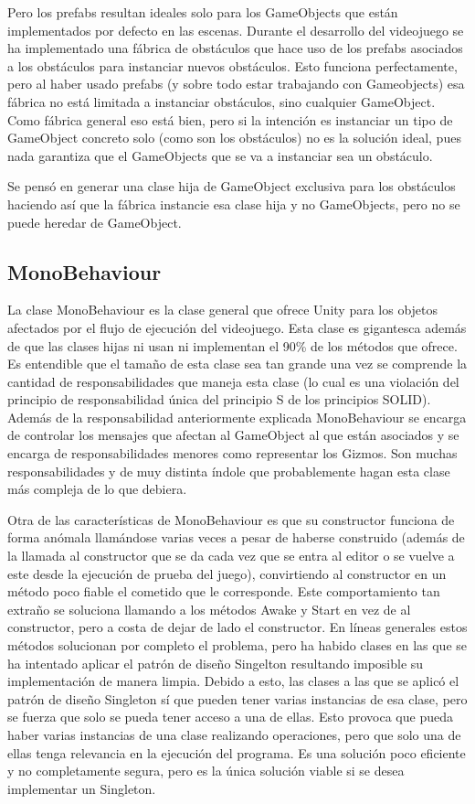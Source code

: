 Pero los prefabs resultan ideales solo para los GameObjects que están implementados por defecto en las escenas. Durante el desarrollo del videojuego se ha implementado una fábrica de obstáculos que hace uso de los prefabs asociados a los obstáculos para instanciar nuevos obstáculos. Esto funciona perfectamente, pero al haber usado prefabs (y sobre todo estar trabajando con Gameobjects) esa fábrica no está limitada a instanciar obstáculos, sino cualquier GameObject. Como fábrica general eso está bien, pero si la intención es instanciar un tipo de GameObject concreto solo (como son los obstáculos) no es la solución ideal, pues nada garantiza que el GameObjects que se va a instanciar sea un obstáculo.

Se pensó en generar una clase hija de GameObject exclusiva para los obstáculos haciendo así que la fábrica instancie esa clase hija y no GameObjects, pero no se puede heredar de GameObject.

\subsection{MonoBehaviour}
La clase MonoBehaviour es la clase general que ofrece Unity para los objetos afectados por el flujo de ejecución del videojuego. Esta clase es gigantesca además de que las clases hijas ni usan ni implementan el 90\% de los métodos que ofrece. Es entendible que el tamaño de esta clase sea tan grande una vez se comprende la cantidad de responsabilidades que maneja esta clase (lo cual es una violación del principio de responsabilidad única del principio S de los principios SOLID). Además de la responsabilidad anteriormente explicada MonoBehaviour se encarga de controlar los mensajes que afectan al GameObject al que están asociados y se encarga de responsabilidades menores como representar los Gizmos. Son muchas responsabilidades y de muy distinta índole que probablemente hagan esta clase más compleja de lo que debiera.

Otra de las características de MonoBehaviour es que su constructor funciona de forma anómala \cite{ConstructoresMonoBehaviour} llamándose varias veces a pesar de haberse construido (además de la llamada al constructor que se da cada vez que se entra al editor o se vuelve a este desde la ejecución de prueba del juego), convirtiendo al constructor en un método poco fiable el cometido que le corresponde. Este comportamiento tan extraño se soluciona llamando a los métodos Awake y Start en vez de al constructor, pero a costa de dejar de lado el constructor. En líneas generales estos métodos solucionan por completo el problema, pero ha habido clases en las que se ha intentado aplicar el patrón de diseño Singelton resultando imposible su implementación de manera limpia. Debido a esto, las clases a las que se aplicó el patrón de diseño Singleton sí que pueden tener varias instancias de esa clase, pero se fuerza que solo se pueda tener acceso a una de ellas. Esto provoca que pueda haber varias instancias de una clase realizando operaciones, pero que solo una de ellas tenga relevancia en la ejecución del programa. Es una solución poco eficiente y no completamente segura, pero es la única solución viable si se desea implementar un Singleton.

